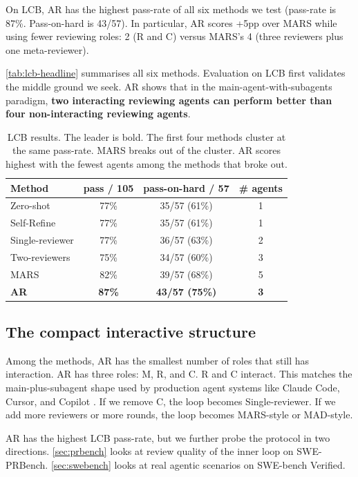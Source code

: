 \documentclass{article}
\begin{document}
On LCB, AR has the highest pass-rate of all six methods we test (pass-rate is 87\%. Pass-on-hard is 43/57). In particular, AR scores +5pp
over MARS while using fewer reviewing roles: 2 (R and C) versus
MARS's 4 (three reviewers plus one meta-reviewer).

\autoref{tab:lcb-headline} summarises all six methods. Evaluation on
LCB first validates the middle ground we seek. AR shows that in the
main-agent-with-subagents paradigm, \textbf{two interacting reviewing
agents can perform better than four non-interacting reviewing agents}.

\begin{table}[t]
\centering
\small
\caption{LCB results. The leader is bold. The first four methods cluster
at the same pass-rate. MARS breaks out of the cluster. AR scores
highest with the fewest agents among the methods that broke out.\label{tab:lcb-headline}}
\begin{tabular}{l|cc|c}
\toprule
Method            & pass / 105 & pass-on-hard / 57 & \# agents \\
\midrule
Zero-shot         & 77\%       & 35/57 (61\%)      & 1 \\
Self-Refine       & 77\%       & 35/57 (61\%)      & 1 \\
Single-reviewer   & 77\%       & 36/57 (63\%)      & 2 \\
Two-reviewers     & 75\%       & 34/57 (60\%)      & 3 \\
MARS               & 82\%       & 39/57 (68\%)      & 5 \\
\textbf{AR}  & \textbf{87\%} & \textbf{43/57 (75\%)} & \textbf{3} \\
\bottomrule
\end{tabular}
\end{table}

\subsection{The compact interactive structure}
\label{sec:lcb-minimal}

Among the methods, AR has the smallest number of roles that still has interaction. AR has
three roles: M, R, and C. R and C interact. This matches the
main-plus-subagent shape used by production agent systems like Claude
Code, Cursor, and Copilot \citep{anthropic-agents}. If we remove C, the
loop becomes Single-reviewer. If we add more reviewers or more rounds,
the loop becomes MARS-style or MAD-style.

AR has the highest LCB pass-rate, but we further probe the protocol in two
directions. \autoref{sec:prbench} looks at review quality of the inner loop on
SWE-PRBench. \autoref{sec:swebench} looks at real agentic scenarios on
SWE-bench Verified.
\end{document}
